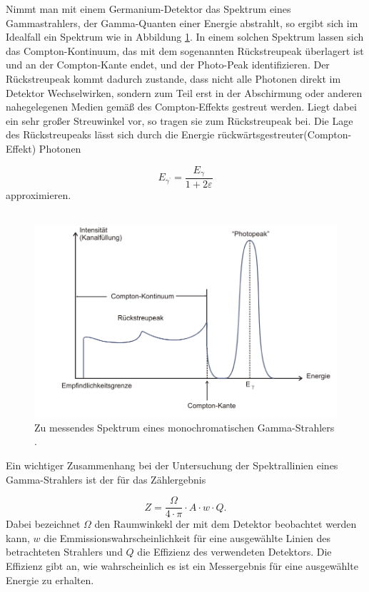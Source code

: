 Nimmt man mit einem Germanium-Detektor das Spektrum eines Gammastrahlers, der Gamma-Quanten einer Energie abstrahlt,
so ergibt sich im Idealfall ein Spektrum wie in Abbildung \ref{fig:idealspektrum}. In einem solchen Spektrum lassen
sich das Compton-Kontinuum, das mit dem sogenannten Rückstreupeak überlagert ist und an der Compton-Kante endet, und der Photo-Peak identifizieren.
Der Rückstreupeak kommt dadurch zustande, dass nicht alle Photonen direkt im Detektor Wechselwirken, sondern zum Teil
erst in der Abschirmung oder anderen nahegelegenen Medien  gemäß des Compton-Effekts gestreut werden. Liegt dabei
ein sehr großer Streuwinkel vor, so tragen sie zum Rückstreupeak bei. Die Lage des Rückstreupeaks lässt sich durch
die Energie rückwärtsgestreuter(Compton-Effekt) Photonen

\begin{equation}
  \label{eqn:rstreupos}
  E_{\gamma^\text{'}} = \frac{E_{\gamma}}{1 + 2\varepsilon}
\end{equation}
approximieren.\\ \\

\FloatBarrier
\begin{figure}
  \includegraphics[width=\textwidth]{content/skizzen/idspektrum.png}
  \caption{Zu messendes Spektrum eines monochromatischen Gamma-Strahlers \cite{sample}.}
  \label{fig:idealspektrum}
\end{figure}
\FloatBarrier
Ein wichtiger Zusammenhang bei der Untersuchung der Spektrallinien eines Gamma-Strahlers ist der für
das Zählergebnis

\begin{equation}
  \label{eqn:effizienz}
  Z = \frac{\Omega}{4\cdot \pi} \cdot A \cdot w \cdot Q .
\end{equation}
Dabei bezeichnet $\Omega$ den Raumwinkekl der mit dem Detektor beobachtet werden kann, $w$ die
Emmissionswahrscheinlichkeit für eine ausgewählte Linien des betrachteten Strahlers und $Q$ die
Effizienz des verwendeten Detektors. Die Effizienz gibt an, wie wahrscheinlich es ist ein Messergebnis für eine ausgewählte
Energie zu erhalten.

\cite{sample}